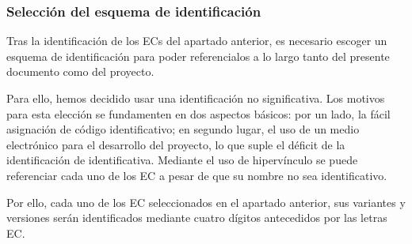 \subsubsection{Selección del esquema de identificación}
\par Tras la identificación de los ECs del apartado anterior, es necesario escoger un esquema de identificación para poder referencialos a lo largo tanto del presente documento como del proyecto.
\par Para ello, hemos decidido usar una identificación no significativa. Los motivos para esta elección se fundamenten en dos aspectos básicos: por un lado, la fácil asignación de código identificativo; en segundo lugar, el uso de un medio electrónico para el desarrollo del proyecto, lo que suple el déficit de la identificación de identificativa. Mediante el uso de hipervínculo se puede referenciar cada uno de los EC a pesar de que su nombre no sea identificativo.
\par Por ello, cada uno de los EC seleccionados en el apartado anterior, sus variantes y versiones serán identificados mediante cuatro dígitos antecedidos por las letras EC.
%
%
%
%
